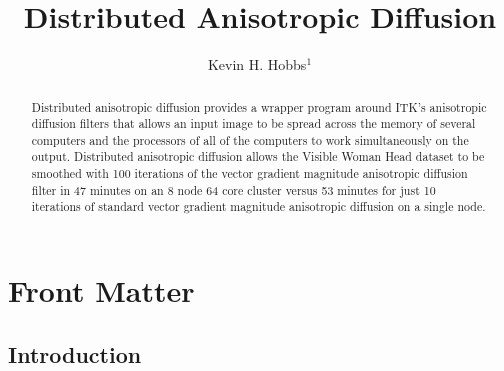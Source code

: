\documentclass{InsightArticle}
\title{Distributed Anisotropic Diffusion}
\author{Kevin H. Hobbs$^{1}$}
\newcommand{\IJhandlerIDnumber}{3242}
\begin{document}
%
% 
\IJhandlefooter{\IJhandlerIDnumber}


\ifpdf
\else
\fi


\maketitle


\ifhtml
\chapter*{Front Matter\label{front}}
\fi


\begin{abstract}
\noindent

Distributed anisotropic diffusion provides a wrapper 
program around ITK's anisotropic diffusion filters that 
allows an input image to be spread across the memory of 
several computers and the processors of all of the 
computers to work simultaneously on the output. 
Distributed anisotropic diffusion allows the Visible Woman 
Head dataset to be smoothed with 100 iterations of the 
vector gradient magnitude anisotropic diffusion filter in 
47 minutes on an 8 node 64 core cluster versus 53 minutes 
for just 10 iterations of standard vector gradient 
magnitude anisotropic diffusion on a single node.

\end{abstract}

\IJhandlenote{\IJhandlerIDnumber}

\tableofcontents

\section{Introduction}
\end{document}
